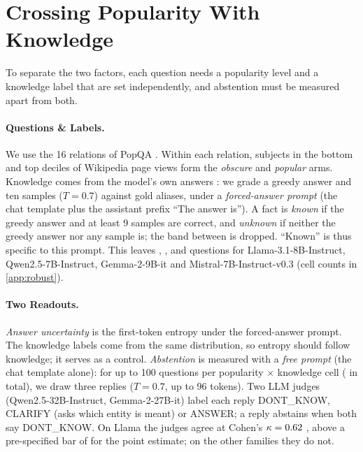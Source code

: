 \documentclass[manuscript,screen,review,anonymous,nonacm]{acmart}
\begin{document}
\section{Crossing Popularity With Knowledge}
\label{sec:setup}

To separate the two factors, each question needs a popularity level and a knowledge label that are set independently, and abstention must be measured apart from both.

\paragraph{Questions \& Labels.} We use the 16 relations of PopQA \cite{mallen2023popqa}. Within each relation, subjects in the bottom and top deciles of Wikipedia page views form the \emph{obscure} and \emph{popular} arms. Knowledge comes from the model's own answers \cite{gekhman2024slick}: we grade a greedy answer and ten samples ($T=0.7$) against gold aliases, under a \emph{forced-answer prompt} (the chat template plus the assistant prefix ``The answer is''). A fact is \emph{known} if the greedy answer and at least 9 samples are correct, and \emph{unknown} if neither the greedy answer nor any sample is; the band between is dropped. ``Known'' is thus specific to this prompt. This leaves \faLlamaN, \faQwenN, \faGemmaN{} and \faMistralN{} questions for Llama-3.1-8B-Instruct, Qwen2.5-7B-Instruct, Gemma-2-9B-it and Mistral-7B-Instruct-v0.3 \cite{llama3,qwen25,gemma2,mistral7b} (cell counts in \cref{app:robust}).

\paragraph{Two Readouts.} \emph{Answer uncertainty} is the first-token entropy under the forced-answer prompt. The knowledge labels come from the same distribution, so entropy should follow knowledge; it serves as a control. \emph{Abstention} is measured with a \emph{free prompt} (the chat template alone): for up to 100 questions per popularity $\times$ knowledge cell (\hmLlamaItems{} in total), we draw three replies ($T=0.7$, up to 96 tokens). Two LLM judges (Qwen2.5-32B-Instruct, Gemma-2-27B-it) label each reply DONT\_KNOW, CLARIFY (asks which entity is meant) or ANSWER; a reply abstains when both say DONT\_KNOW. On Llama the judges agree at Cohen's $\kappa=0.62$ \lkKappaCI, above a pre-specified bar of \kappaBar{} for the point estimate; on the other families they do not.
\end{document}
